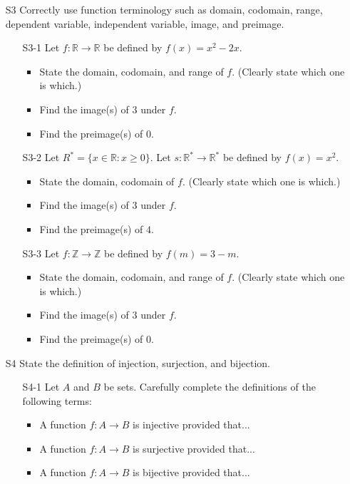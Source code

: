 \documentclass[11pt]{article}
\newcommand{\Z}{\mathbb{Z}}
\newcommand{\R}{\mathbb{R}}
\begin{document}
\begin{itemize}
\item[S3] Correctly use function terminology such as domain, codomain, range, dependent variable, independent variable, image, and preimage.
	\begin{enumerate}
	\item[S3-1] Let $f: \mathbb{R} \to \mathbb{R}$ be defined by $f(x) = x^2-2x$.
		\begin{itemize}
		\item State the domain, codomain, and range of $f$. (Clearly state which one is which.)
		\item Find the image(s) of $3$ under $f$.
		\item Find the preimage(s) of $0$.
		\end{itemize}
	\item[S3-2] Let $R^* = \{x\in \R: x\ge 0\}$.  Let $s: \R^* \to \R^*$ be defined by $f(x) = x^2$.
		\begin{itemize}
		\item State the domain, codomain of $f$. (Clearly state which one is which.)
		\item Find the image(s) of $3$ under $f$.
		\item Find the preimage(s) of $4$.
		\end{itemize}
	\item[S3-3]  Let $f: \Z\to \Z$ be defined by $f(m) = 3-m$.
		\begin{itemize}
		\item State the domain, codomain, and range of $f$. (Clearly state which one is which.)
		\item Find the image(s) of $3$ under $f$.
		\item Find the preimage(s) of $0$.
		\end{itemize}
	\end{enumerate}
	
	\newpage
	
\item[S4] State the definition of injection, surjection, and bijection.
	\begin{enumerate}
	\item[S4-1] Let $A$ and $B$ be sets. Carefully complete the definitions of the following terms: 
		\begin{itemize}
		\item  A function $f: A \to B$ is injective provided that...
		\item A function $f: A\to B$ is surjective provided that...
		\item A function $f: A\to B$ is bijective provided that...
		\end{itemize}
	\end{enumerate}
	

\end{itemize}
\end{document}
